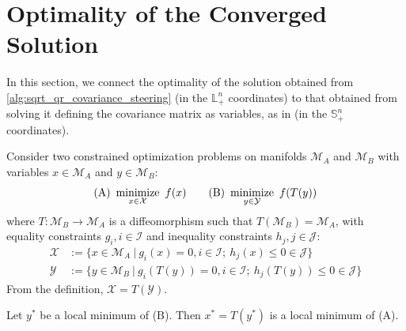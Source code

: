 \section{Optimality of the Converged Solution}

In this section, we connect the optimality of the solution obtained from \cref{alg:sqrt_qr_covariance_steering} (in the $\mathbb{L}_+^n$ coordinates) to that obtained from solving it defining the covariance matrix as variables, as in \cite{liuOptimalCovarianceSteering2025,pilipovskyComputationallyEfficientChance2024} (in the $\mathbb{S}_+^n$ coordinates).

 Consider two constrained optimization problems on manifolds $\mathcal{M}_A$ and $\mathcal{M}_B$ with variables $x \in \mathcal{M}_A$ and $y \in \mathcal{M}_B$:%
\begin{equation*}
\text{(A)} \ \operatorname*{minimize}_{x \in \mathcal{X}} \ f(x) \qquad
\text{(B)} \ \operatorname*{minimize}_{y \in \mathcal{Y}} \ f(T(y))
\end{equation*}
where $T: \mathcal{M}_B \rightarrow \mathcal{M}_A$ is a diffeomorphism such that $T(\mathcal{M}_B) = \mathcal{M}_A$, with equality constraints $g_i, i \in \mathcal{I}$ and inequality constraints $h_j, j \in \mathcal{J}$:
\begin{align}
	\mathcal{X} &:= \{ x \in \mathcal{M}_A \ |\  g_i(x) = 0, i \in \mathcal{I}; \ h_j(x) \leq 0 \in \mathcal{J} \} \nonumber \\ 
	\mathcal{Y} &:= \{ y \in \mathcal{M}_B \ |\  g_i(T(y)) = 0, i \in \mathcal{I}; \ h_j(T(y)) \leq 0\in \mathcal{J} \} \nonumber 
\end{align}
From the definition, $\mathcal{X} = T(\mathcal{Y})$.

\begin{proposition}
\label{prop:global_optimality_diffeomorphism}
Let $y^*$ be a local minimum of (B). Then $x^* = T(y^*)$ is a local minimum of (A).
\end{proposition}

